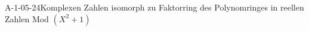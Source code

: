 
\begin{EXA}{A-1-05-24}{Komplexen Zahlen isomorph zu Faktorring des Polynomringes in reellen Zahlen Mod $(X^2+1)$}
\end{EXA}
